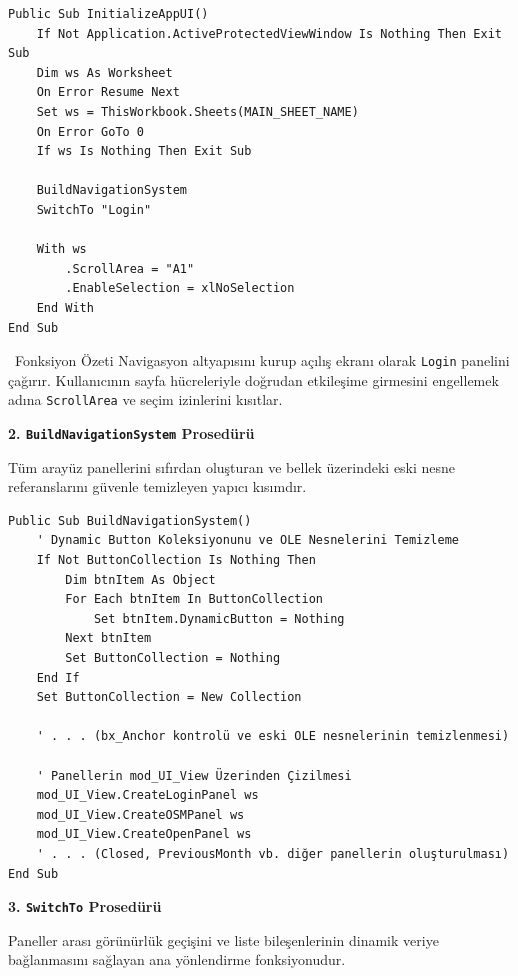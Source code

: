 \begin{lstlisting}[caption={InitializeAppUI Prosedürü Kod Yapısı}]
Public Sub InitializeAppUI()
    If Not Application.ActiveProtectedViewWindow Is Nothing Then Exit Sub
    Dim ws As Worksheet
    On Error Resume Next
    Set ws = ThisWorkbook.Sheets(MAIN_SHEET_NAME)
    On Error GoTo 0
    If ws Is Nothing Then Exit Sub
    
    BuildNavigationSystem
    SwitchTo "Login"
    
    With ws
        .ScrollArea = "A1"
        .EnableSelection = xlNoSelection
    End With
End Sub
\end{lstlisting}

\begin{infobox}{\faPlay\ Fonksiyon Özeti}
Navigasyon altyapısını kurup açılış ekranı olarak \texttt{Login} panelini çağırır. Kullanıcının sayfa hücreleriyle doğrudan etkileşime girmesini engellemek adına \texttt{ScrollArea} ve seçim izinlerini kısıtlar.
\end{infobox}

\vspace{0.3cm}

\textbf{\textcolor{primary}{2. \texttt{BuildNavigationSystem} Prosedürü}}

Tüm arayüz panellerini sıfırdan oluşturan ve bellek üzerindeki eski nesne referanslarını güvenle temizleyen yapıcı kısımdır.

\begin{lstlisting}[caption={BuildNavigationSystem Prosedürü (Özet)}]
Public Sub BuildNavigationSystem()
    ' Dynamic Button Koleksiyonunu ve OLE Nesnelerini Temizleme
    If Not ButtonCollection Is Nothing Then
        Dim btnItem As Object
        For Each btnItem In ButtonCollection
            Set btnItem.DynamicButton = Nothing
        Next btnItem
        Set ButtonCollection = Nothing
    End If
    Set ButtonCollection = New Collection
    
    ' . . . (bx_Anchor kontrolü ve eski OLE nesnelerinin temizlenmesi)
    
    ' Panellerin mod_UI_View Üzerinden Çizilmesi
    mod_UI_View.CreateLoginPanel ws
    mod_UI_View.CreateOSMPanel ws
    mod_UI_View.CreateOpenPanel ws
    ' . . . (Closed, PreviousMonth vb. diğer panellerin oluşturulması)
End Sub
\end{lstlisting}

\newpage

\textbf{\textcolor{primary}{3. \texttt{SwitchTo} Prosedürü}}

Paneller arası görünürlük geçişini ve liste bileşenlerinin dinamik veriye bağlanmasını sağlayan ana yönlendirme fonksiyonudur.

